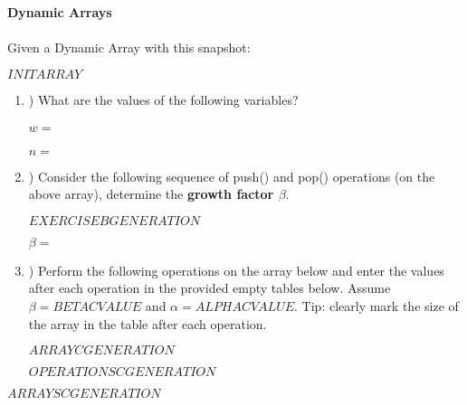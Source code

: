 \textbf{\LARGE{\color{tumgadPurple} Dynamic Arrays}}\\
\\
\noindent
Given a Dynamic Array with this snapshot:
\begin{center}
    $INITARRAY$
\end{center}
\begin{enumerate}[label=\alph*]
    \item \hspace{-5px}) What are the values of the following variables?\\
    \\
    $w = $\\
    \\
    $n = $
    \\
    \item \hspace{-5px}) Consider the following sequence of push() and pop() operations (on the above array), determine the \textbf{growth factor $\beta$}.
    \begin{center}
        $EXERCISEBGENERATION$
    \end{center}
    $\beta = $\\
    \item \hspace{-5px}) Perform the following operations on the array below and enter the values after each operation in the provided empty
    tables below. Assume $\beta = BETACVALUE$ and $\alpha = ALPHACVALUE$. Tip: clearly mark the size of the array in the table after each operation.
    \begin{center}
        $ARRAYCGENERATION$
    \end{center}
    $OPERATIONSCGENERATION$
\end{enumerate}
\begin{center}
    $ARRAYSCGENERATION$
\end{center}
